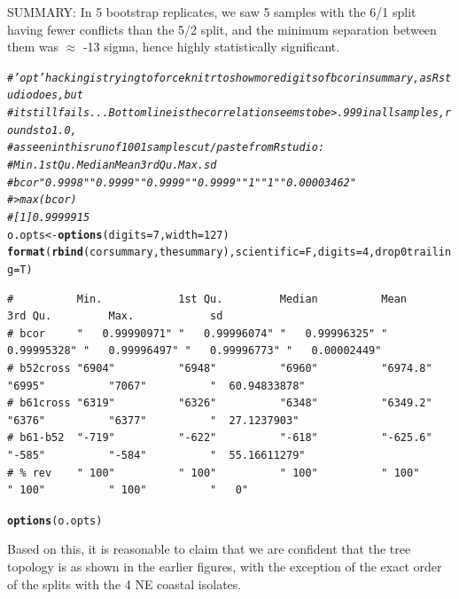 \documentclass{article}\usepackage[]{graphicx}\usepackage[]{color}
\makeatletter
\newcommand{\hlnum}[1]{\textcolor[rgb]{0.686,0.059,0.569}{#1}}%
\newcommand{\hlcom}[1]{\textcolor[rgb]{0.678,0.584,0.686}{\textit{#1}}}%
\newcommand{\hlstd}[1]{\textcolor[rgb]{0.345,0.345,0.345}{#1}}%
\newcommand{\hlkwb}[1]{\textcolor[rgb]{0.69,0.353,0.396}{#1}}%
\newcommand{\hlkwc}[1]{\textcolor[rgb]{0.333,0.667,0.333}{#1}}%
\newcommand{\hlkwd}[1]{\textcolor[rgb]{0.737,0.353,0.396}{\textbf{#1}}}%
\newenvironment{kframe}{%
 \def\at@end@of@kframe{}%
 \ifinner\ifhmode%
  \def\at@end@of@kframe{\end{minipage}}%
  \begin{minipage}{\columnwidth}%
 \fi\fi%
 \def\FrameCommand##1{\hskip\@totalleftmargin \hskip-\fboxsep
 \colorbox{shadecolor}{##1}\hskip-\fboxsep
     \hskip-\linewidth \hskip-\@totalleftmargin \hskip\columnwidth}%
 \MakeFramed {\advance\hsize-\width
   \@totalleftmargin\z@ \linewidth\hsize
   \@setminipage}}%
 {\par\unskip\endMakeFramed%
 \at@end@of@kframe}
\newenvironment{knitrout}{}{} %
\makeatother
\begin{document}
SUMMARY: In 5 bootstrap replicates, we saw 5 samples with the 6/1 split having fewer
conflicts than the 5/2 split, and the minimum separation between them was $\approx$
-13 sigma, hence highly statistically significant.

\begin{knitrout}\footnotesize
{}\color{fgcolor}\begin{kframe}
\begin{alltt}
\hlcom{# 'opt' hacking is trying to force knitr to show more digits of bcor in summary, as Rstudio does, but}
\hlcom{# it still fails...  Bottom line is the correlation seems to be  > .999 in all samples, rounds to 1.0,}
\hlcom{# as seen in this run of 1001 samples cut/paste from Rstudio:}
\hlcom{#          Min.        1st Qu.     Median      Mean        3rd Qu. Max.   sd             }
\hlcom{# bcor     "   0.9998" "   0.9999" "   0.9999" "   0.9999" "   1"  "   1" "   0.00003462"}
\hlcom{# > max(bcor)}
\hlcom{# [1] 0.9999915}
\hlstd{o.opts} \hlkwb{<-} \hlkwd{options}\hlstd{(}\hlkwc{digits}\hlstd{=}\hlnum{7}\hlstd{,}\hlkwc{width}\hlstd{=}\hlnum{127}\hlstd{)}
\hlkwd{format}\hlstd{(}\hlkwd{rbind}\hlstd{(corsummary,thesummary),}\hlkwc{scientific}\hlstd{=F,}\hlkwc{digits}\hlstd{=}\hlnum{4}\hlstd{,}\hlkwc{drop0trailing}\hlstd{=T)}
\end{alltt}
\begin{verbatim}
#          Min.            1st Qu.         Median          Mean            3rd Qu.         Max.            sd             
# bcor     "   0.99990971" "   0.99996074" "   0.99996325" "   0.99995328" "   0.99996497" "   0.99996773" "   0.00002449"
# b52cross "6904"          "6948"          "6960"          "6974.8"        "6995"          "7067"          "  60.94833878"
# b61cross "6319"          "6326"          "6348"          "6349.2"        "6376"          "6377"          "  27.1237903" 
# b61-b52  "-719"          "-622"          "-618"          "-625.6"        "-585"          "-584"          "  55.16611279"
# % rev    " 100"          " 100"          " 100"          " 100"          " 100"          " 100"          "   0"
\end{verbatim}
\begin{alltt}
\hlkwd{options}\hlstd{(o.opts)}
\end{alltt}
\end{kframe}
\end{knitrout}

Based on this, it is reasonable to claim that we are confident that the tree topology is as shown in the earlier
figures, with the exception of the exact order of the splits with the 4 NE coastal isolates.
\end{document}
